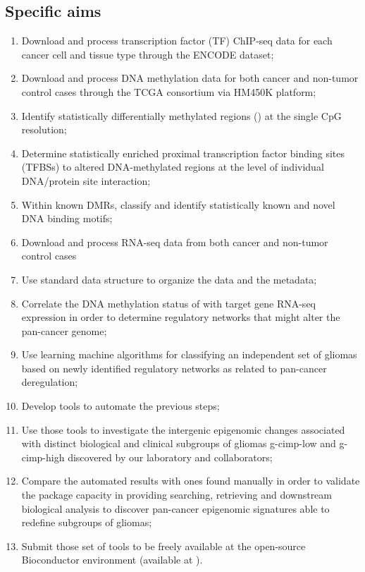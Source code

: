\subsection{Specific aims}
\begin{enumerate}
    \item Download and process transcription factor (TF) ChIP-seq data for each cancer cell and tissue type through the ENCODE dataset;
    \item Download and process DNA methylation data for both cancer and non-tumor control cases through the TCGA consortium via HM450K platform;
    \item Identify statistically differentially methylated regions () at the single CpG resolution;
    \item Determine statistically enriched proximal transcription factor binding sites (TFBSs) to altered DNA-methylated regions at the level of individual DNA/protein site interaction; 
    \item Within known DMRs, classify and identify statistically known and novel DNA binding motifs;
    \item Download and process RNA-seq data from both cancer and non-tumor control cases
    \item Use standard data structure to organize the data and the metadata; 
    \item Correlate the DNA methylation status of  with target gene RNA-seq expression in order to determine regulatory networks that might alter the pan-cancer genome;
    \item Use learning machine algorithms for classifying an independent set of gliomas based on newly identified regulatory networks as related to pan-cancer deregulation;
    \item Develop tools to automate the previous steps;
    \item Use those tools to investigate the intergenic epigenomic changes associated with distinct biological and clinical subgroups of gliomas g-cimp-low and g-cimp-high discovered by our laboratory and collaborators;
    \item Compare the automated results with ones found manually in order to validate the package capacity in providing searching, retrieving and downstream biological analysis to discover pan-cancer epigenomic signatures able to redefine subgroups of gliomas; 
    \item Submit those set of tools to be freely available at the open-source Bioconductor environment (available at ).
\end{enumerate}

